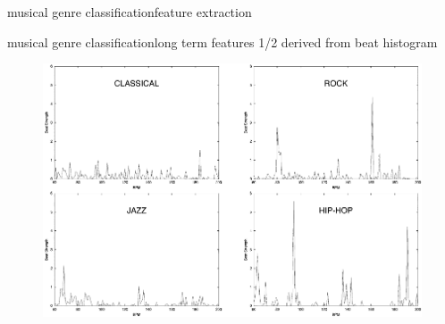 \begin{frame}{musical genre classification}{feature extraction}
\begin{enumerate}
            \end{enumerate}
            \vspace{20mm}
        \end{frame}
        \begin{frame}{musical genre classification}{long term features 1/2}
            derived from beat histogram
            \begin{figure}
                \centering
                \includegraphics[scale=.25]{graph/genre_beat_histogram}
            \end{figure}
        \end{frame}
